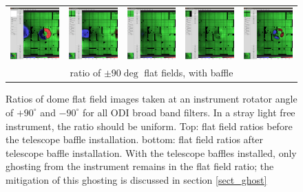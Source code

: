 \documentclass[]{spieman}
\begin{document}
\begin{figure}
\begin{tabular}{ccccc}
			
			\includegraphics[width=0.18\columnwidth]{images/baffle_u.png} &
			\includegraphics[width=0.18\columnwidth]{images/baffle_g.png} &
			\includegraphics[width=0.18\columnwidth]{images/baffle_r.png} &
			\includegraphics[width=0.18\columnwidth]{images/baffle_i.png} &
			\includegraphics[width=0.18\columnwidth]{images/baffle_z.png} 
			\\[1ex] 
			\multicolumn{5}{c}{ratio of $\pm 90 \deg$ flat
				fields, with baffle} \\[2ex] 
		\end{tabular}
		
		\caption{\label{fig_flatfieldbaffle} Ratios of dome flat field 
			images
			taken at an instrument rotator angle of $+90^\circ$ and 
			$-90^\circ$ 
			for all ODI broad band filters. In a stray light free  
			instrument, the ratio should 
			be uniform. Top: flat field ratios before the telescope baffle 
			installation. 
			bottom: flat field ratios after telescope baffle installation. 
			With the telescope 
			baffles installed, only ghosting from the instrument remains in 
			the flat field 
			ratio; the mitigation of this ghosting is discussed in section 
			\ref{sect_ghost} }
		
	\end{figure}
\end{document}
